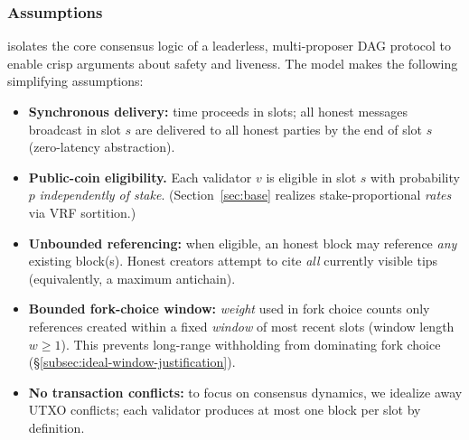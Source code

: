 \subsubsection{Assumptions}
\label{subsec:ideal-overview}
\ProjIdeal isolates the core consensus logic of a leaderless, multi-proposer DAG protocol to enable crisp arguments about safety and liveness. The model makes the following simplifying assumptions:
\begin{itemize}
  \item \textbf{Synchronous delivery:} time proceeds in slots; all honest messages broadcast in slot $s$ are delivered to all honest parties by the end of slot $s$ (zero-latency abstraction).
    \item \textbf{Public-coin eligibility.} 
  Each validator $v$ is eligible in slot $s$ with probability $p$ \emph{independently of stake}. (Section~\ref{sec:base} realizes stake-proportional \emph{rates} via VRF sortition.) 
  
  \item \textbf{Unbounded referencing:} when eligible, an honest block may reference \emph{any} existing block(s). Honest creators attempt to cite \emph{all} currently visible tips (equivalently, a maximum antichain).%
  \item \textbf{Bounded fork-choice window:} \emph{weight} used in fork choice counts only references created within a fixed \emph{window} of most recent slots (window length $w\ge1$). This prevents long-range withholding from dominating fork choice (\S\ref{subsec:ideal-window-justification}).
  \item \textbf{No transaction conflicts:} to focus on consensus dynamics, we idealize away UTXO conflicts; each validator produces at most one block per slot by definition.
\end{itemize}


